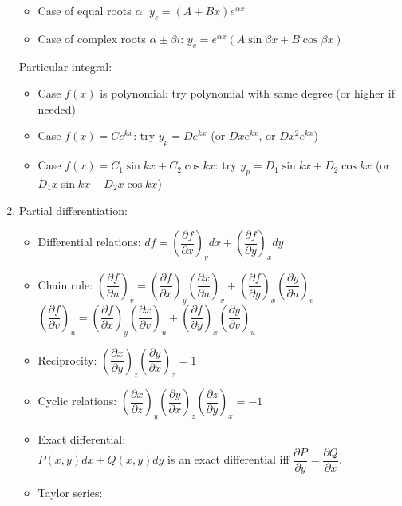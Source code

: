 \documentclass[fleqn]{article}
\begin{document}
\begin{enumerate}
\begin{itemize}[noitemsep, topsep=0pt]
            \item Case of equal roots $\alpha$: $y_c=(A+Bx)e^{\alpha x}$
            \item Case of complex roots $\alpha\pm\beta i$: $y_c=e^{\alpha x}(A\sin\beta x+B\cos\beta x)$
        \end{itemize}
        Particular integral: 
        \begin{itemize}[noitemsep, topsep=0pt]
            \item Case $f(x)$ is polynomial: try polynomial with same degree (or higher if needed)
            \item Case $f(x)=Ce^{kx}$: try $y_p=De^{kx}$ (or $Dxe^{kx}$, or $Dx^2e^{kx}$)
            \item Case $f(x)=C_1\sin{kx}+C_2\cos{kx}$: try $y_p=D_1\sin{kx}+D_2\cos{kx}$ (or $D_1x\sin{kx}+D_2x\cos{kx}$)
        \end{itemize}
    \item Partial differentiation:
        \begin{itemize}[topsep=0pt]
            \item Differential relations:\smallbreak
                $df=\left(\dfrac{\partial f}{\partial x}\right)_ydx+\left(\dfrac{\partial f}{\partial y}\right)_xdy$
            \item Chain rule:\smallbreak
                $\left(\dfrac{\partial f}{\partial u}\right)_v=\left(\dfrac{\partial f}{\partial x}\right)_y\left(\dfrac{\partial x}{\partial u}\right)_v+\left(\dfrac{\partial f}{\partial y}\right)_x\left(\dfrac{\partial y}{\partial u}\right)_v$\\
                $\left(\dfrac{\partial f}{\partial v}\right)_u=\left(\dfrac{\partial f}{\partial x}\right)_y\left(\dfrac{\partial x}{\partial v}\right)_u+\left(\dfrac{\partial f}{\partial y}\right)_x\left(\dfrac{\partial y}{\partial v}\right)_u$
            \item Reciprocity:\smallbreak
                $\left(\dfrac{\partial x}{\partial y}\right)_z\left(\dfrac{\partial y}{\partial x}\right)_z=1$
            \item Cyclic relations:\smallbreak
                $\left(\dfrac{\partial x}{\partial z}\right)_y\left(\dfrac{\partial y}{\partial x}\right)_z\left(\dfrac{\partial z}{\partial y}\right)_x=-1$
            \item Exact differential:\\
                $P(x,y)dx+Q(x,y)dy$ is an exact differential iff $\dfrac{\partial P}{\partial y}=\dfrac{\partial Q}{\partial x}$.
            \item Taylor series:\smallbreak

\end{itemize}
\end{enumerate}
\end{document}
